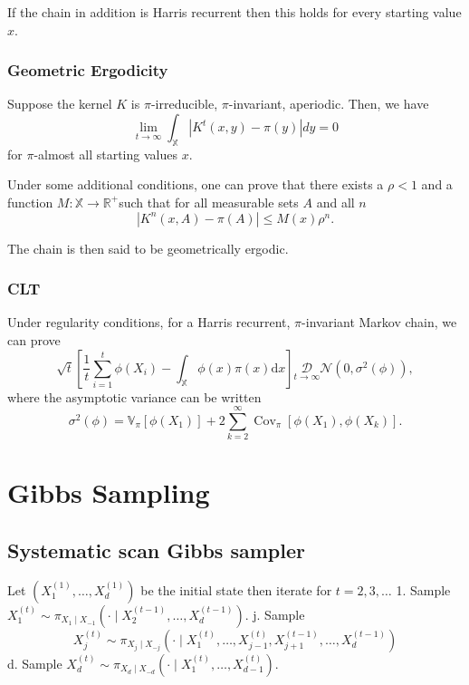 \documentclass{article}
\begin{document}
If the chain in addition is Harris recurrent then this holds for every starting value $x$.

\subsubsection{Geometric Ergodicity}
Suppose the kernel $K$ is $\pi$-irreducible, $\pi$-invariant, aperiodic. Then, we have
$$
\lim _{t \rightarrow \infty} \int_{\mathbb{X}}\left|K^t(x, y)-\pi(y)\right| d y=0
$$
for $\pi$-almost all starting values $x$.

Under some additional conditions, one can prove that there exists a $\rho<1$ and a function $M: \mathbb{X} \rightarrow \mathbb{R}^{+}$such that for all measurable sets $A$ and all $n$
$$
\left|K^n(x, A)-\pi(A)\right| \leq M(x) \rho^n .
$$

The chain is then said to be geometrically ergodic.

\subsubsection{CLT}

Under regularity conditions, for a Harris recurrent, $\pi$-invariant Markov chain, we can prove
$$
\sqrt{t}\left[\frac{1}{t} \sum_{i=1}^t \phi\left(X_i\right)-\int_{\mathbb{X}} \phi(x) \pi(x) \mathrm{d} x\right] \underset{t \rightarrow \infty}{\mathcal{D}} \mathcal{N}\left(0, \sigma^2(\phi)\right),
$$
where the asymptotic variance can be written
$$
\sigma^2(\phi)=\mathbb{V}_\pi\left[\phi\left(X_1\right)\right]+2 \sum_{k=2}^{\infty} \operatorname{Cov}_\pi\left[\phi\left(X_1\right), \phi\left(X_k\right)\right] .
$$

\section{Gibbs Sampling}
\subsection{Systematic scan Gibbs sampler}
Let $\left(X_1^{(1)}, \ldots, X_d^{(1)}\right)$ be the initial state then iterate for $t=2,3, \ldots$
1. Sample $X_1^{(t)} \sim \pi_{X_1 \mid X_{-1}}\left(\cdot \mid X_2^{(t-1)}, \ldots, X_d^{(t-1)}\right)$.
\newline
j. Sample
$$
X_j^{(t)} \sim \pi_{X_j \mid X_{-j}}\left(\cdot \mid X_1^{(t)}, \ldots, X_{j-1}^{(t)}, X_{j+1}^{(t-1)}, \ldots, X_d^{(t-1)}\right)
$$
\newline
d. Sample $X_d^{(t)} \sim \pi_{X_d \mid X_{-d}}\left(\cdot \mid X_1^{(t)}, \ldots, X_{d-1}^{(t)}\right)$.
\end{document}

